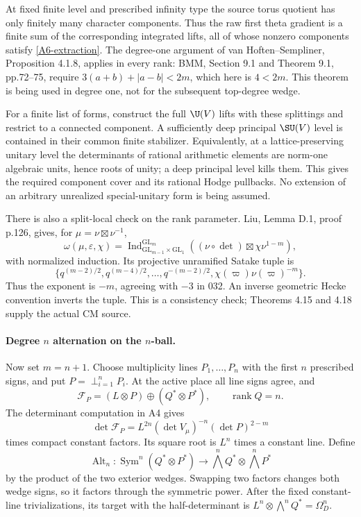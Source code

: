 \documentclass[11pt]{article}
\theoremstyle{definition}\newtheorem{definition}[theorem]{Definition}\newtheorem{remark}[theorem]{Remark}
\begin{document}
At fixed finite level and prescribed infinity type the source
torus quotient has only finitely many character components.
Thus the raw first theta gradient is a finite sum of the corresponding
integrated lifts, all of whose nonzero components satisfy
\eqref{A6-extraction}. The degree-one argument of
van Hoften--Sempliner, Proposition 4.1.8, applies in every rank:
BMM, Section 9.1 and Theorem 9.1, pp.72--75, require
$3(a+b)+|a-b|<2m$, which here is $4<2m$. This theorem is being
used in degree one, not for the subsequent top-degree wedge.

For a finite list of forms, construct the full $\U(V)$ lifts with
these splittings and restrict to a connected component. A sufficiently
deep principal $\SU(V)$ level is contained in their common finite
stabilizer. Equivalently, at a lattice-preserving unitary level the
determinants of rational arithmetic elements are norm-one algebraic
units, hence roots of unity; a deep principal level kills them.
This gives the required component cover and its rational Hodge
pullbacks. No extension of an arbitrary unrealized special-unitary
form is being assumed.

There is also a split-local check on the rank parameter. Liu,
Lemma D.1, proof p.126, gives, for
$\mu=\nu\boxtimes\nu^{-1}$,
\[
 \omega(\mu,\varepsilon,\chi)
 =\operatorname{Ind}_{\mathrm{GL}_{m-1}\times\mathrm{GL}_1}
                       ^{\mathrm{GL}_m}
       ((\nu\circ\det)\boxtimes\chi\nu^{1-m}),
\]
with normalized induction. Its projective unramified Satake tuple is
\[
 \{q^{(m-2)/2},q^{(m-4)/2},\ldots,q^{-(m-2)/2},
                   \chi(\varpi)\nu(\varpi)^{-m}\}.
\]
Thus the exponent is $-m$, agreeing with $-3$ in 032. An inverse
geometric Hecke convention inverts the tuple. This is a consistency
check; Theorems 4.15 and 4.18 supply the actual CM source.

\paragraph{Degree $n$ alternation on the $n$-ball.}
Now set $m=n+1$. Choose multiplicity lines $P_1,\ldots,P_n$ with
the first $n$ prescribed signs, and put $P=\perp_{i=1}^nP_i$.
At the active place all line signs agree, and
\[
 \mathcal F_P=(L\otimes P)\oplus(Q^*\otimes P^*),
 \qquad \operatorname{rank}Q=n.
\]
The determinant computation in A4 gives
\[
 \det\mathcal F_P=L^{2n}(\det V_\mu)^{-n}(\det P)^{2-m}
\]
times compact constant factors. Its square root is $L^n$ times a
constant line. Define
\[
 \operatorname{Alt}_n:\operatorname{Sym}^n(Q^*\otimes P^*)
       \longrightarrow\bigwedge^nQ^*\otimes\bigwedge^nP^*
\]
by the product of the two exterior wedges. Swapping two factors
changes both wedge signs, so it factors through the symmetric power.
After the fixed constant-line trivializations, its target with the
half-determinant is
$L^n\otimes\bigwedge^nQ^*=\Omega_D^n$.
\end{document}
